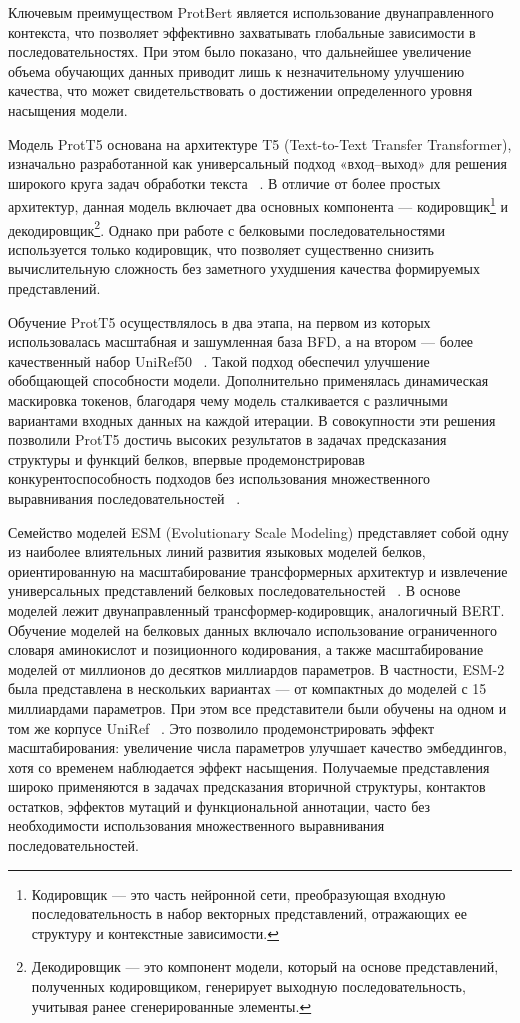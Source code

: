 \documentclass[specification,annotation,times]{itmo-student-thesis}
\begin{document}
Ключевым преимуществом ProtBert является использование двунаправленного контекста, что позволяет эффективно захватывать глобальные зависимости в последовательностях. При этом было показано, что дальнейшее увеличение объема обучающих данных приводит лишь к незначительному улучшению качества, что может свидетельствовать о достижении определенного уровня насыщения модели.

Модель ProtT5 основана на архитектуре T5 (Text-to-Text Transfer Transformer), изначально разработанной как универсальный подход «вход–выход» для решения широкого круга задач обработки текста ~\cite{raffel2020exploring}. В отличие от более простых архитектур, данная модель включает два основных компонента --- кодировщик\footnote{Кодировщик — это часть нейронной сети, преобразующая входную последовательность в набор векторных представлений, отражающих ее структуру и контекстные зависимости.} и декодировщик\footnote{Декодировщик — это компонент модели, который на основе представлений, полученных кодировщиком, генерирует выходную последовательность, учитывая ранее сгенерированные элементы.}. Однако при работе с белковыми последовательностями используется только кодировщик, что позволяет существенно снизить вычислительную сложность без заметного ухудшения качества формируемых представлений.

Обучение ProtT5 осуществлялось в два этапа, на первом из которых использовалась масштабная и зашумленная база BFD, а на втором --- более качественный набор UniRef50 ~\cite{suzek2007uniref}. Такой подход обеспечил улучшение обобщающей способности модели. Дополнительно применялась динамическая маскировка токенов, благодаря чему модель сталкивается с различными вариантами входных данных на каждой итерации. В совокупности эти решения позволили ProtT5 достичь высоких результатов в задачах предсказания структуры и функций белков, впервые продемонстрировав конкурентоспособность подходов без использования множественного выравнивания последовательностей  ~\cite{elnaggar2021prottrans}.

Семейство моделей ESM (Evolutionary Scale Modeling) представляет собой одну из наиболее влиятельных линий развития языковых моделей белков, ориентированную на масштабирование трансформерных архитектур и извлечение универсальных представлений белковых последовательностей ~\cite{rives2021biological}. В основе моделей лежит двунаправленный трансформер-кодировщик, аналогичный BERT. Обучение моделей на белковых данных включало использование ограниченного словаря аминокислот и позиционного кодирования, а также масштабирование моделей от миллионов до десятков миллиардов параметров. В частности, ESM-2 была представлена в нескольких вариантах --- от компактных до моделей с 15 миллиардами параметров. При этом все представители были обучены на одном и том же корпусе UniRef ~\cite{suzek2007uniref}. Это позволило продемонстрировать эффект масштабирования: увеличение числа параметров улучшает качество эмбеддингов, хотя со временем наблюдается эффект насыщения. Получаемые представления широко применяются в задачах предсказания вторичной структуры, контактов остатков, эффектов мутаций и функциональной аннотации, часто без необходимости использования множественного выравнивания последовательностей.
\end{document}
